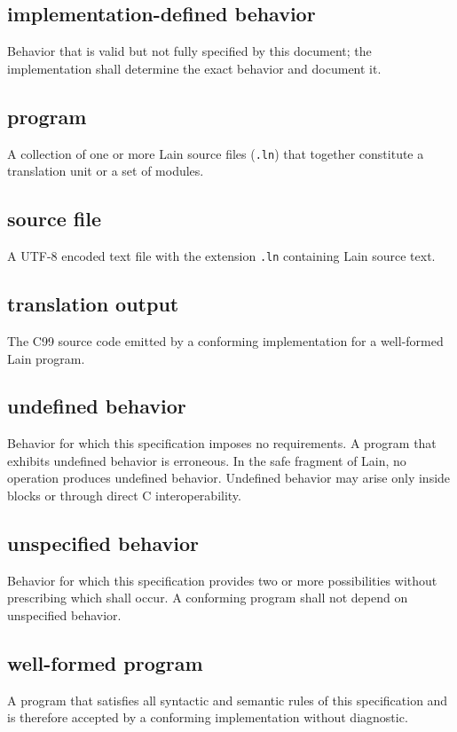\subsection*{implementation-defined behavior}
Behavior that is valid but not fully specified by this document; the
implementation shall determine the exact behavior and document it.

\subsection*{program}
A collection of one or more Lain source files (\texttt{.ln}) that together
constitute a translation unit or a set of modules.

\subsection*{source file}
A UTF-8 encoded text file with the extension \texttt{.ln} containing Lain
source text.

\subsection*{translation output}
The C99 source code emitted by a conforming implementation for a
well-formed Lain program.

\subsection*{undefined behavior}
Behavior for which this specification imposes no requirements.  A program
that exhibits undefined behavior is erroneous.  In the safe fragment of
Lain, no operation produces undefined behavior.  Undefined behavior may
arise only inside  blocks or through direct C
interoperability.

\subsection*{unspecified behavior}
Behavior for which this specification provides two or more possibilities
without prescribing which shall occur.  A conforming program shall not
depend on unspecified behavior.

\subsection*{well-formed program}
A program that satisfies all syntactic and semantic rules of this
specification and is therefore accepted by a conforming implementation
without diagnostic.

